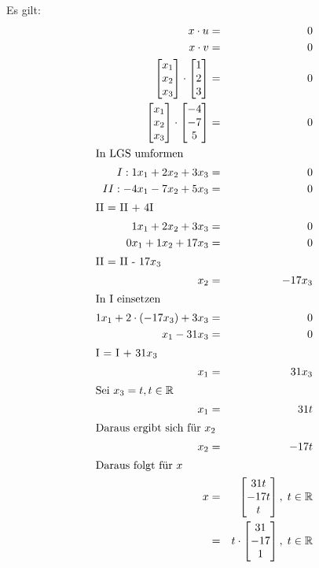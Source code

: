 \documentclass[10pt,a4paper,oneside,ngerman,numbers=noenddot]{scrartcl}
\begin{document}
\subsection{} %
Es gilt: \\
\begin{alignat*}{2}
x \cdot u &=& 0 \\
x \cdot v &=& 0 \\
\begin{bmatrix}
x_{1} \\
x_{2} \\
x_{3}
\end{bmatrix} \cdot 
\begin{bmatrix}
1 \\
2 \\
3
\end{bmatrix} &=& 0 \\
\begin{bmatrix}
x_{1} \\
x_{2} \\
x_{3}
\end{bmatrix} \cdot 
\begin{bmatrix}
-4 \\
-7 \\
5
\end{bmatrix} &=& 0 \\
\intertext{In LGS umformen}
I: 1x_{1} + 2x_{2} + 3x_{3} &=& 0 \\
II: -4x_{1} - 7x_{2} + 5x_{3} &=& 0 \\
\intertext{II = II + 4I}
1x_{1} + 2x_{2} + 3x_{3} &=& 0 \\
0x_{1} + 1x_{2} + 17x_{3} &=& 0 \\
\intertext{II = II - $17x_{3}$}
x_{2} &=& -17x_{3} \\
\intertext{In I einsetzen}
1x_{1} + 2 \cdot (-17x_{3}) + 3x_{3} &=& 0 \\
x_{1} - 31x_{3} &=& 0 \\
\intertext{I = I + $31x_{3}$}
x_{1} &=& 31x_{3} \\
\intertext{Sei $x_{3} = t, t \in \mathbb{R}$}
x_{1} &=& 31t \\
\intertext{Daraus ergibt sich für $x_{2}$}
x_{2} &=& -17t \\
\intertext{Daraus folgt für $x$}
x &=& \begin{bmatrix}
31t \\
-17t \\
t
\end{bmatrix}, \; t \in \mathbb{R} \\
&=& t \cdot \begin{bmatrix}
31 \\
-17 \\
1
\end{bmatrix}, \; t \in \mathbb{R}
\end{alignat*}
\end{document}
